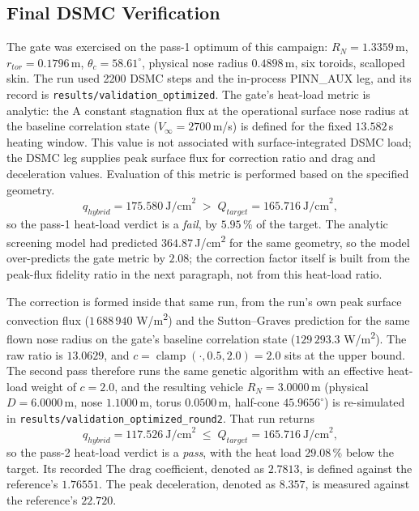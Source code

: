 \subsection{Final DSMC Verification}
The gate was exercised on the pass-1 optimum of this campaign: $R_N = 1.3359$\,m, $r_{tor} = 0.1796$\,m, $\theta_c = 58.61^\circ$, physical nose radius $0.4898$\,m, six toroids, scalloped skin. The run used 2200 DSMC steps and the in-process PINN\_AUX leg, and its record is
\texttt{results/validation\_optimized}. The gate's heat-load metric is analytic: the
A constant stagnation flux at the operational surface nose radius at the baseline correlation state ($V_\infty = 2700$\,m/s) is defined for the fixed $13.582$\,s heating window. This value is not associated with surface-integrated DSMC load; the DSMC leg supplies peak surface flux for correction ratio and drag and deceleration values. Evaluation of this metric is performed based on the specified geometry.
\begin{equation}
    q_{hybrid} = 175.580\ \text{J/cm}^2 \;>\; Q_{target} = 165.716\ \text{J/cm}^2,
    \label{eq:gate_fail}
\end{equation}
so the pass-1 heat-load verdict is a \emph{fail}, by $5.95\,\%$ of the target. The analytic
screening model had predicted $364.87$\,J/cm\textsuperscript{2} for the same geometry, so the model over-predicts the gate metric by $2.08$; the correction factor itself is built from the peak-flux fidelity ratio in the next paragraph, not from this heat-load ratio.

The correction is formed inside that same run, from the run's own peak surface convection flux ($1\,688\,940$ W/m\textsuperscript{2}) and the Sutton--Graves prediction for the same flown nose radius on the gate's baseline correlation state ($129\,293.3$ W/m\textsuperscript{2}). The raw ratio is $13.0629$, and $c = \operatorname{clamp}(\cdot, 0.5, 2.0) = 2.0$ sits at the upper bound. The second pass therefore runs the same genetic algorithm with an effective heat-load weight of $c = 2.0$, and the resulting vehicle $R_N = 3.0000$\,m (physical $D = 6.0000$\,m, nose $1.1000$\,m, torus $0.0500$\,m, half-cone $45.9656^\circ$) is re-simulated in
\texttt{results/validation\_optimized\_round2}. That run returns
\begin{equation}
    q_{hybrid} = 117.526\ \text{J/cm}^2 \;\leq\; Q_{target} = 165.716\ \text{J/cm}^2,
    \label{eq:gate_pass}
\end{equation}
so the pass-2 heat-load verdict is a \emph{pass}, with the heat load $29.08\,\%$ below the target. Its recorded
The drag coefficient, denoted as $2.7813$, is defined against the reference's $1.76551$. The peak deceleration, denoted as $8.357$, is measured against the reference's $22.720$.

